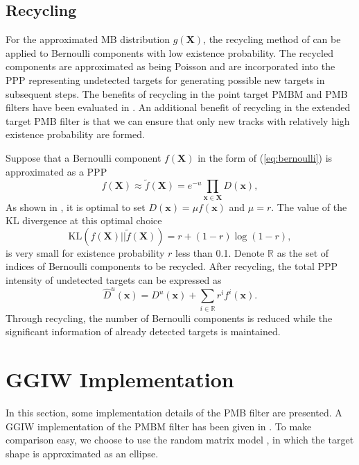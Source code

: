\documentclass[conference]{IEEEtran}
\begin{document}
\subsection{Recycling}
For the approximated MB distribution $g(\mathbf{X})$, the recycling method of \cite{recycle} can be applied to Bernoulli components with low existence probability. The recycled components are approximated as being Poisson and are incorporated into the PPP representing undetected targets for generating possible new targets in subsequent steps. The benefits of recycling in the point target PMBM and PMB filters have been evaluated in \cite{performanceevaluation}. An additional benefit of recycling in the extended target PMB filter is that we can ensure that only new tracks with relatively high existence probability are formed. 

Suppose that a Bernoulli component $f(\mathbf{X})$ in the form of (\ref{eq:bernoulli}) is approximated as a PPP
\begin{equation}
    f(\mathbf{X}) \approx \tilde{f}(\mathbf{X}) = e^{-u}\prod_{\mathbf{x}\in \mathbf{X}}D(\mathbf{x}),
\end{equation}
As shown in \cite[p. 359]{rfs}, it is optimal to set $D(\mathbf{x})=\mu f(\mathbf{x})$ and $\mu=r$. 
The value of the KL divergence at this optimal choice
\begin{equation}
    \text{KL}(f(\mathbf{X})||\tilde{f}(\mathbf{X})) = r + (1-r)\log(1-r),
\end{equation}
is very small for existence probability $r$ less than 0.1. Denote $\mathbb{R}$ as the set of indices of Bernoulli components to be recycled. After recycling, the total PPP intensity of undetected targets can be expressed as
\begin{equation}
    \hat{D}^u(\mathbf{x}) = D^u(\mathbf{x}) + \sum_{i\in\mathbb{R}}r^if^i(\mathbf{x}).
\end{equation}
Through recycling, the number of Bernoulli components is reduced while the significant information of already detected targets is maintained. 


\section{GGIW Implementation}
In this section, some implementation details of the PMB filter are presented. A GGIW implementation of the PMBM filter has been given in \cite{pmbmextended2}. To make comparison easy, we choose to use the random matrix model \cite{randomMatrix,randomMatrix2}, in which the target shape is approximated as an ellipse.
\end{document}
